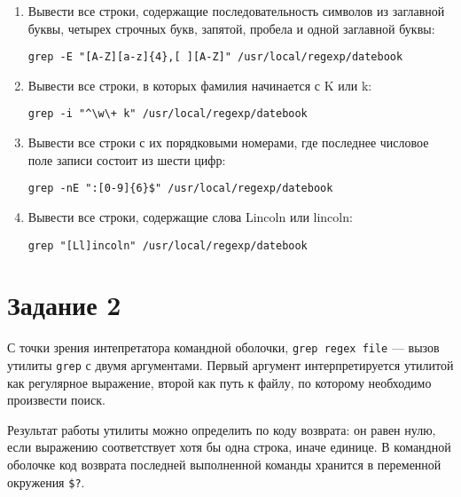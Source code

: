 \documentclass[listings]{labreport}
\begin{document}
\begin{enumerate}
\item Вывести все строки, содержащие последовательность символов из
  заглавной буквы, четырех строчных букв, запятой, пробела и одной заглавной буквы:
\begin{verbatim}
grep -E "[A-Z][a-z]{4},[ ][A-Z]" /usr/local/regexp/datebook
\end{verbatim}

\item Вывести все строки, в которых фамилия начинается с K или k:
\begin{verbatim}
grep -i "^\w\+ k" /usr/local/regexp/datebook
\end{verbatim}

\item Вывести все строки с их порядковыми номерами, где последнее числовое поле записи состоит из шести цифр:
\begin{verbatim}
grep -nE ":[0-9]{6}$" /usr/local/regexp/datebook
\end{verbatim}

\item Вывести все строки, содержащие слова Lincoln или lincoln:
\begin{verbatim}
grep "[Ll]incoln" /usr/local/regexp/datebook
\end{verbatim}
\end{enumerate}

\newpage
\section*{Задание 2}

С точки зрения интепретатора командной оболочки, \verb|grep regex file| —
вызов утилиты \verb|grep| с двумя аргументами.
Первый аргумент интерпретируется утилитой как регулярное выражение,
второй как путь к файлу, по которому необходимо произвести поиск.

Результат работы утилиты можно определить по коду возврата: он равен нулю,
если выражению соответствует хотя бы одна строка, иначе единице. В командной оболочке
код возврата последней выполненной команды хранится в переменной окружения \verb|$?|.
\end{document}
